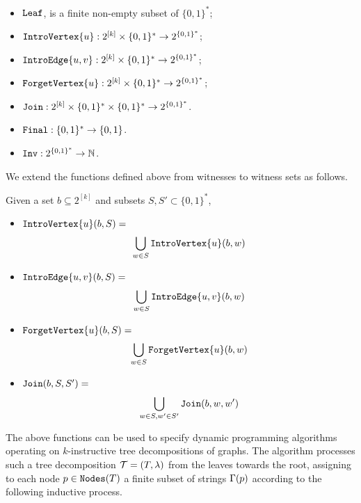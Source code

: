 \begin{itemize}
    \item $\texttt{Leaf}$, is a finite non-empty subset of ${\{0,1\}^*}$;
    \item $\texttt{IntroVertex}\{u\}:2^{[k]}\times \{0,1\}^*\rightarrow 2^{\{0,1\}^*}$;
    \item $\texttt{IntroEdge}\{u,v\}:2^{[k]}\times\{0,1\}^*\rightarrow 2^{\{0,1\}^*}$;
    \item $\texttt{ForgetVertex}\{u\}:2^{[k]}\times \{0,1\}^*\rightarrow 2^{\{0,1\}^*}$;
    \item $\texttt{Join}:2^{[k]}\times \{0,1\}^*\times \{0,1\}^*\rightarrow 2^{\{0,1\}^*}$.
    \item $\texttt{Final}:\{0,1\}^*\rightarrow \{0,1\}$. 
    \item $\texttt{Inv}:2^{\{0,1\}^*}\rightarrow \mathbb{N}$. 
\end{itemize}
%

We extend the functions 
defined above from witnesses to witness sets as follows. 

\begin{definition}
Given a set  $b \subseteq 2^{[k]}$ and subsets $S, S'\subset \{0,1\}^*$, 
%
\begin{itemize}
    \item $\texttt{IntroVertex}\{u\}(b,S) =$ $$ \bigcup_{w\in S} \texttt{IntroVertex}\{u\}(b,w)$$ 
    \item $\texttt{IntroEdge}\{u,v\}(b,S) =$ $$  \bigcup_{w\in S} \texttt{IntroEdge}\{u,v\}(b,w)$$
    \item $\texttt{ForgetVertex}\{u\}(b,S) =$ $$ \bigcup_{w\in S}\texttt{ForgetVertex}\{u\}(b,w)$$
    \item $\texttt{Join}(b,S,S') =$ $$ \bigcup_{w\in S,w' \in S' } \texttt{Join}(b,w,w')$$
\end{itemize}
\end{definition}






The above functions can be used to specify dynamic programming algorithms operating on $k$-instructive tree decompositions of graphs. The algorithm processes such a tree decomposition $\mathcal{T} = (T,\lambda)$ from the leaves towards the root, assigning to each node $p\in \texttt{Nodes}(T)$ a finite subset of strings $\Gamma(p)$ according to the following inductive process. 

